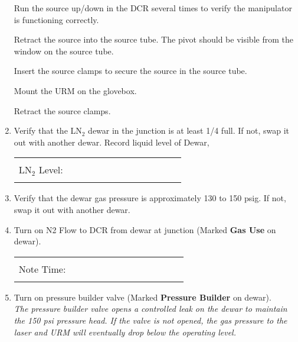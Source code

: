 \begin{enumerate}
\checkitem Run the source up/down in the DCR several times to verify the
    manipulator is functioning correctly.

\checkitem Retract the  source into the source tube.  The pivot should be 
    visible from the window on the source tube.
  
\checkitem Insert the source clamps to secure the source in the source tube.
 
\checkitem Mount the URM on the glovebox.
  
\checkitem Retract the source clamps.
 

\item\checkbox Verify that the LN$_2$ dewar in the junction is
  at least 1/4 full.  If not, swap it out with another dewar.
  Record liquid level of Dewar,
     \begin{center}
     \begin{tabular}{|l|}
     \hline
      \\
     LN$_2$ Level:~~~~~~~~~~~~~~~~~~~~~~~~\\
      \\
     \hline
     \end{tabular}
     \end{center}

\item\checkbox Verify that the dewar gas pressure is approximately
  130 to 150 psig. If not, swap it out with another dewar.

\item\checkbox Turn on N2 Flow to DCR from dewar at junction 
  (Marked {\bf Gas Use} on dewar).
     \begin{center}
     \begin{tabular}{|l|}
     \hline
      \\
     Note Time:~~~~~~~~~~~~~~~~~~~~~~~~\\
      \\
     \hline
     \end{tabular}
     \end{center}

\item\checkbox Turn on pressure builder valve (Marked {\bf Pressure Builder} 
  on dewar).\\
  \small
  {\em The pressure builder valve opens a controlled leak on the dewar
       to maintain the 150 psi pressure head.  If the valve is not
       opened, the gas pressure to the laser and URM will eventually
       drop below the operating level.}
  \normalsize


\end{enumerate}
